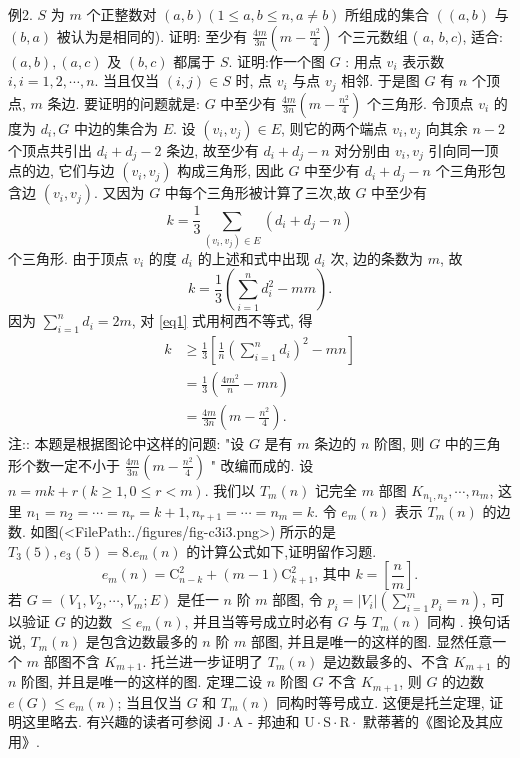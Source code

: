 例2. $S$ 为 $m$ 个正整数对 $(a, b)(1 \leqslant a, b \leqslant n, a \neq b)$ 所组成的集合 $\left((a, b)\right.$ 与 $(b, a)$ 被认为是相同的). 证明: 至少有 $\frac{4 m}{3 n}\left(m-\frac{n^2}{4}\right)$ 个三元数组 ( $a$, $b, c)$, 适合: $(a, b),(a, c)$ 及 $(b, c)$ 都属于 $S$. 
证明:作一个图 $G$ : 用点 $v_i$ 表示数 $i, i=1,2, \cdots, n$. 当且仅当 $(i, j) \in S$ 时, 点 $v_i$ 与点 $v_j$ 相邻.
于是图 $G$ 有 $n$ 个顶点, $m$ 条边.
要证明的问题就是: $G$ 中至少有 $\frac{4 m}{3 n}\left(m-\frac{n^2}{4}\right)$ 个三角形.
令顶点 $v_i$ 的度为 $d_i, G$ 中边的集合为 $E$. 设 $\left(v_i, v_j\right) \in E$, 则它的两个端点 $v_i, v_j$ 向其余 $n-2$ 个顶点共引出 $d_i+d_j-2$ 条边, 故至少有 $d_i+d_j-n$ 对分别由 $v_i, v_j$ 引向同一顶点的边, 它们与边 $\left(v_i, v_j\right)$ 构成三角形, 因此 $G$ 中至少有 $d_i+d_j-n$ 个三角形包含边 $\left(v_i, v_j\right)$. 又因为 $G$ 中每个三角形被计算了三次,故 $G$ 中至少有
$$
k=\frac{1}{3} \sum_{\left(v_i, v_j\right) \in E}\left(d_i+d_j-n\right)
$$
个三角形.
由于顶点 $v_i$ 的度 $d_i$ 的上述和式中出现 $d_i$ 次, 边的条数为 $m$, 故
$$
k=\frac{1}{3}\left(\sum_{i=1}^n d_i^2-m m\right) . \label{eq1}
$$
因为 $\sum_{i=1}^n d_i=2 m$, 对 \ref{eq1} 式用柯西不等式, 得
$$
\begin{aligned}
k & \geqslant \frac{1}{3}\left[\frac{1}{n}\left(\sum_{i=1}^n d_i\right)^2-m n\right] \\
& =\frac{1}{3}\left(\frac{4 m^2}{n}-m n\right) \\
& =\frac{4 m}{3 n}\left(m-\frac{n^2}{4}\right) .
\end{aligned}
$$
注:: 本题是根据图论中这样的问题: "设 $G$ 是有 $m$ 条边的 $n$ 阶图, 则 $G$ 中的三角形个数一定不小于 $\frac{4 m}{3 n}\left(m-\frac{n^2}{4}\right)$ " 改编而成的.
设 $n=m k+r(k \geqslant 1,0 \leqslant r<m)$. 我们以 $T_m(n)$ 记完全 $m$ 部图 $K_{n_1, n_2}, \cdots, n_m$, 这里 $n_1=n_2=\cdots=n_r= k+1, n_{r+1}=\cdots=n_m=k$. 令 $e_m(n)$ 表示 $T_m(n)$ 的边数.
如图(<FilePath:./figures/fig-c3i3.png>) 所示的是 $T_3(5), e_3(5)=8 . e_m(n)$ 的计算公式如下,证明留作习题.
$$
e_m(n)=\mathrm{C}_{n-k}^2+(m-1) \mathrm{C}_{k+1}^2 \text {, 其中 } k=\left[\frac{n}{m}\right] .
$$
若 $G=\left(V_1, V_2, \cdots, V_m ; E\right)$ 是任一 $n$ 阶 $m$ 部图, 令 $p_i=\left|V_i\right|\left(\sum_{i=1}^m p_i=n\right)$, 可以验证 $G$ 的边数 $\leqslant e_m(n)$, 并且当等号成立时必有 $G$ 与 $T_m(n)$ 同构 . 换句话说, $T_m(n)$ 是包含边数最多的 $n$ 阶 $m$ 部图, 并且是唯一的这样的图.
显然任意一个 $m$ 部图不含 $K_{m+1}$. 托兰进一步证明了 $T_m(n)$ 是边数最多的、不含 $K_{m+1}$ 的 $n$ 阶图, 并且是唯一的这样的图.
定理二设 $n$ 阶图 $G$ 不含 $K_{m+1}$, 则 $G$ 的边数 $e(G) \leqslant e_m(n)$; 当且仅当 $G$ 和 $T_m(n)$ 同构时等号成立.
这便是托兰定理, 证明这里略去.
有兴趣的读者可参阅 $\mathrm{J} \cdot \mathrm{A}$ - 邦迪和 $\mathrm{U} \cdot \mathrm{S} \cdot \mathrm{R} \cdot$ 默蒂著的《图论及其应用》.



